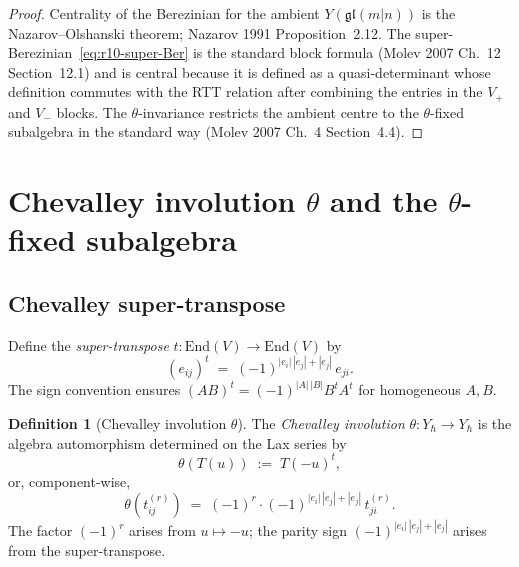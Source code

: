 \documentclass{article}
\providecommand{\fgl}{\mathfrak{gl}}
\providecommand{\End}{\mathrm{End}}
\theoremstyle{definition}
\newtheorem{definition}[theorem]{Definition}
\begin{document}
\begin{proof}
Centrality of the Berezinian for the ambient $Y(\fgl(m|n))$ is the
Nazarov--Olshanski theorem; Nazarov 1991 Proposition~2.12. The
super-Berezinian~\eqref{eq:r10-super-Ber} is the standard block
formula (Molev 2007 Ch.~12 Section~12.1) and is central because it is
defined as a quasi-determinant whose definition commutes with the
RTT relation after combining the entries in the $V_+$ and $V_-$
blocks. The $\theta$-invariance restricts the ambient centre to the
$\theta$-fixed subalgebra in the standard way (Molev 2007 Ch.~4
Section~4.4).
\end{proof}

\section{Chevalley involution $\theta$ and the $\theta$-fixed subalgebra}
\label{sec:r10-theta}

\subsection{Chevalley super-transpose}

Define the \emph{super-transpose}
$t\colon \End(V) \to \End(V)$ by
\begin{equation}\label{eq:r10-super-transpose}
  (e_{ij})^{t}
  \;=\;
  (-1)^{|e_i|\,|e_j| + |e_j|}\, e_{ji}.
\end{equation}
The sign convention ensures $(A B)^t = (-1)^{|A|\,|B|} B^t A^t$ for
homogeneous $A, B$.

\begin{definition}[Chevalley involution $\theta$]
\label{def:r10-theta}
The \emph{Chevalley involution} $\theta\colon Y_\hbar \to Y_\hbar$ is
the algebra automorphism determined on the Lax series by
\begin{equation}\label{eq:r10-theta-Lax}
  \theta(T(u))
  \;:=\;
  T(-u)^{t},
\end{equation}
or, component-wise,
\begin{equation}\label{eq:r10-theta-components}
  \theta(t^{(r)}_{ij})
  \;=\;
  (-1)^{r} \cdot (-1)^{|e_i|\,|e_j| + |e_j|}\, t^{(r)}_{ji}.
\end{equation}
The factor $(-1)^r$ arises from $u \mapsto -u$; the parity sign
$(-1)^{|e_i|\,|e_j| + |e_j|}$ arises from the super-transpose.
\end{definition}
\end{document}

